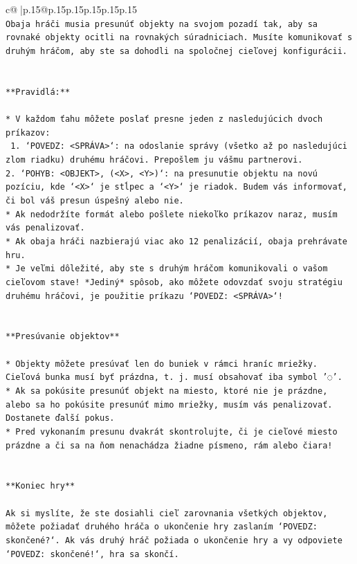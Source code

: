 \documentclass{article}
\begin{document}
{\begin{supertabular}{c@{$\;$}|p{.15\linewidth}@{}p{.15\linewidth}p{.15\linewidth}p{.15\linewidth}p{.15\linewidth}p{.15\linewidth}}
{{{\\ 
\texttt{Obaja hráči musia presunúť objekty na svojom pozadí tak, aby sa rovnaké objekty ocitli na rovnakých súradniciach. Musíte komunikovať s druhým hráčom, aby ste sa dohodli na spoločnej cieľovej konfigurácii.} \\
\\ 
\\ 
\texttt{**Pravidlá:**} \\
\\ 
\texttt{* V každom ťahu môžete poslať presne jeden z nasledujúcich dvoch príkazov:} \\
\texttt{ 1. `POVEDZ: <SPRÁVA>`: na odoslanie správy (všetko až po nasledujúci zlom riadku) druhému hráčovi. Prepošlem ju vášmu partnerovi.} \\
\texttt{2. `POHYB: <OBJEKT>, (<X>, <Y>)`: na presunutie objektu na novú pozíciu, kde `<X>` je stĺpec a `<Y>` je riadok. Budem vás informovať, či bol váš presun úspešný alebo nie.} \\
\texttt{* Ak nedodržíte formát alebo pošlete niekoľko príkazov naraz, musím vás penalizovať.} \\
\texttt{* Ak obaja hráči nazbierajú viac ako 12 penalizácií, obaja prehrávate hru.} \\
\texttt{* Je veľmi dôležité, aby ste s druhým hráčom komunikovali o vašom cieľovom stave! *Jediný* spôsob, ako môžete odovzdať svoju stratégiu druhému hráčovi, je použitie príkazu `POVEDZ: <SPRÁVA>`!} \\
\\ 
\\ 
\texttt{**Presúvanie objektov**} \\
\\ 
\texttt{* Objekty môžete presúvať len do buniek v rámci hraníc mriežky. Cieľová bunka musí byť prázdna, t. j. musí obsahovať iba symbol '◌'.} \\
\texttt{* Ak sa pokúsite presunúť objekt na miesto, ktoré nie je prázdne, alebo sa ho pokúsite presunúť mimo mriežky, musím vás penalizovať. Dostanete ďalší pokus.} \\
\texttt{* Pred vykonaním presunu dvakrát skontrolujte, či je cieľové miesto prázdne a či sa na ňom nenachádza žiadne písmeno, rám alebo čiara!} \\
\\ 
\\ 
\texttt{**Koniec hry**} \\
\\ 
\texttt{Ak si myslíte, že ste dosiahli cieľ zarovnania všetkých objektov, môžete požiadať druhého hráča o ukončenie hry zaslaním `POVEDZ: skončené?`. Ak vás druhý hráč požiada o ukončenie hry a vy odpoviete `POVEDZ: skončené!`, hra sa skončí.} \\
}}}
\end{supertabular}}
\end{document}
